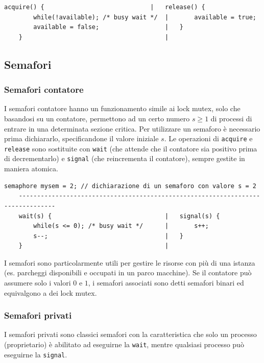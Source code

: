 \documentclass[a4paper]{article}
\begin{document}
\begin{lstlisting}[numbers=none]
	acquire() {								|	release() {
		while(!available); /* busy wait */	|		available = true;
		available = false;					|	}
	}										|
\end{lstlisting}



\subsection{Semafori}
\subsubsection*{Semafori contatore}
I semafori contatore hanno un funzionamento simile ai lock mutex, solo che basandosi su un contatore, permettono ad un certo
numero \(s \geq 1\) di processi di entrare in una determinata sezione critica. Per utilizzare un semaforo è necessario prima
dichiararlo, specificandone il valore iniziale \(s\). Le operazioni di \verb|acquire| e \verb|release| sono sostituite con
\verb|wait| (che attende che il contatore sia positivo prima di decrementarlo) e \verb|signal| (che reincrementa il contatore),
sempre gestite in maniera atomica.

\begin{lstlisting}[numbers=none]
	semaphore mysem = 2; // dichiarazione di un semaforo con valore s = 2
	--------------------------------------------------------------------------------
	wait(s) {								|	signal(s) {
		while(s <= 0); /* busy wait */		|		s++;
		s--;								|	}
	}										|
\end{lstlisting}
I semafori sono particolarmente utili per gestire le risorse con più di una istanza (es. parcheggi disponibili e occupati in
un parco macchine). Se il contatore può assumere solo i valori \(0\) e \(1\), i semafori associati sono detti semafori binari ed equivalgono a dei
lock mutex.

\subsubsection*{Semafori privati}
I semafori privati sono classici semafori con la caratteristica che solo un processo (proprietario) è abilitato ad eseguirne
la \verb|wait|, mentre qualsiasi processo può eseguirne la \verb|signal|.
\end{document}
